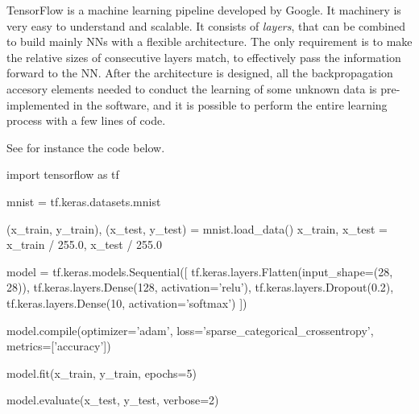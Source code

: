 \documentclass[]{report}
\begin{document}
TensorFlow is a machine learning pipeline developed by Google. It machinery is very easy to understand and scalable. It consists of \textit{layers}, that can be combined to build mainly NNs with a flexible architecture. The only requirement is to make the relative sizes of consecutive layers match, to effectively pass the information forward to the NN. After the architecture is designed, all the backpropagation accesory elements needed to conduct the learning of some unknown data is pre-implemented in the software, and it is possible to perform the entire learning process with a few lines of code. 

See for instance the code below.
\vskip5mm

\begin{boxedverbatim}
import tensorflow as tf

mnist = tf.keras.datasets.mnist

(x_train, y_train), (x_test, y_test) = mnist.load_data()
x_train, x_test = x_train / 255.0, x_test / 255.0

model = tf.keras.models.Sequential([
  tf.keras.layers.Flatten(input_shape=(28, 28)),
  tf.keras.layers.Dense(128, activation='relu'),
  tf.keras.layers.Dropout(0.2),
  tf.keras.layers.Dense(10, activation='softmax')
])

model.compile(optimizer='adam',
              loss='sparse_categorical_crossentropy',
              metrics=['accuracy'])

model.fit(x_train, y_train, epochs=5)

model.evaluate(x_test,  y_test, verbose=2)

\end{boxedverbatim}
\vskip5mm
\end{document}
